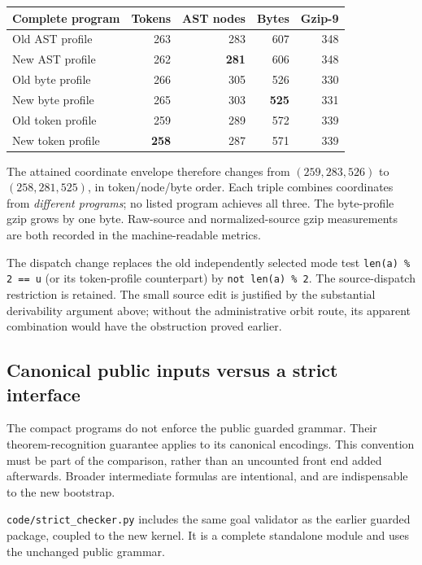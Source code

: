 \documentclass[11pt,letterpaper]{article}
\theoremstyle{definition}\newtheorem{definition}[theorem]{Definition}
\theoremstyle{remark}\newtheorem{remark}[theorem]{Remark}
\newcommand{\file}[1]{{\small\nolinkurl{#1}}}
\begin{document}
\begin{center}\small
\begin{tabular}{@{}lrrrr@{}}
\toprule
Complete program & Tokens & AST nodes & Bytes & Gzip-9\\
\midrule
Old AST profile & 263 & 283 & 607 & 348\\
New AST profile & 262 & \textbf{281} & 606 & 348\\
Old byte profile & 266 & 305 & 526 & 330\\
New byte profile & 265 & 303 & \textbf{525} & 331\\
Old token profile & 259 & 289 & 572 & 339\\
New token profile & \textbf{258} & 287 & 571 & 339\\
\bottomrule
\end{tabular}
\end{center}

The attained coordinate envelope therefore changes from
$(259,283,526)$ to $(258,281,525)$, in token/node/byte order.
Each triple combines coordinates from \emph{different programs}; no listed
program achieves all three. The byte-profile gzip grows by one byte.
Raw-source and normalized-source gzip measurements are both recorded in
the machine-readable metrics.

The dispatch change replaces the old independently selected mode test
\texttt{len(a) \% 2 == u} (or its token-profile counterpart) by
\texttt{not len(a) \% 2}. The source-dispatch restriction is retained.
The small source edit is justified by the substantial derivability argument
above; without the administrative orbit route, its apparent combination
would have the obstruction proved earlier.

\subsection{Canonical public inputs versus a strict interface}

The compact programs do not enforce the public guarded grammar.
Their theorem-recognition guarantee applies to its canonical encodings.
This convention must be part of the comparison, rather than an uncounted
front end added afterwards. Broader intermediate formulas are intentional,
and are indispensable to the new bootstrap.

\file{code/strict_checker.py} includes the same goal validator as the earlier
guarded package, coupled to the new kernel. It is a complete standalone
module and uses the unchanged public grammar.
\end{document}
